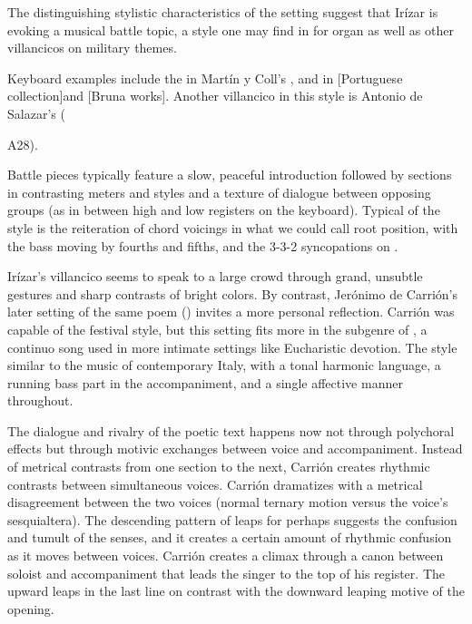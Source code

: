 The distinguishing stylistic characteristics of the setting suggest that Irízar is evoking a musical battle topic, a style one may find in  for organ as well as other villancicos on military themes.%
  \begin{Footnote}
  \XXX
  Keyboard examples include the  in Martín y Coll's \XXX, and in [Portuguese collection]\XXX and [Bruna works]\XXX.
  Another villancico in this style is Antonio de Salazar's  (\signature{MEX-Mc}{A28}).
  \end{Footnote}
Battle pieces typically feature a slow, peaceful introduction followed by sections in contrasting meters and styles and a texture of dialogue between opposing groups (as in between high and low registers on the keyboard). 
Typical of the style is the reiteration of chord voicings in what we could call root position, with the bass moving by fourths and fifths, and the 3-3-2 syncopations on .

Irízar's villancico seems to speak to a large crowd through grand, unsubtle gestures and sharp contrasts of bright colors.
By contrast, Jerónimo de Carrión's later setting of the same poem () invites a more personal reflection.
Carrión was capable of the festival style, but this setting fits more in the subgenre of , a continuo song used in more intimate settings like Eucharistic devotion.
The style similar to the  music of contemporary Italy, with a tonal harmonic language, a running bass part in the accompaniment, and a single affective manner throughout.


The dialogue and rivalry of the poetic text happens now not through polychoral effects but through motivic exchanges between voice and accompaniment.
Instead of metrical contrasts from one section to the next, Carrión creates rhythmic contrasts between simultaneous voices.
Carrión dramatizes  with a metrical disagreement between the two voices (normal ternary motion versus the voice's sesquialtera).
The descending pattern of leaps for  perhaps suggests the confusion and tumult of the senses, and it creates a certain amount of rhythmic confusion as it moves between voices.
Carrión creates a climax through a canon between soloist and accompaniment that leads the singer to the top of his register.
The upward leaps in the last line on  contrast with the downward leaping motive of the opening.

